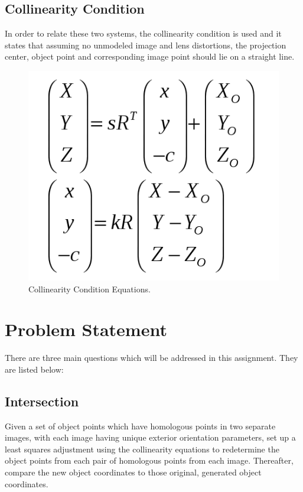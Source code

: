 \documentclass{article}
\begin{document}
\newpage

\subsection{Collinearity Condition}
In order to relate these two systems, the collinearity condition is used and it states that assuming no unmodeled image and lens
distortions, the projection center, object point and corresponding image point should lie on a straight line.

\begin{figure}[h!]
\centering
\caption{Collinearity Condition Equations.}
\includegraphics[scale=0.3]{collinearity_equations}
\end{figure}

\newpage

\section{Problem Statement}
There are three main questions which will be addressed in this assignment. They are listed below:

\subsection{Intersection}
Given a set of object points which have homologous points in two separate images, with each image having unique exterior
orientation parameters, set up a least squares adjustment using the collinearity equations to redetermine the object points
from each pair of homologous points from each image. Thereafter, compare the new object coordinates to those original,
generated object coordinates.
\end{document}
